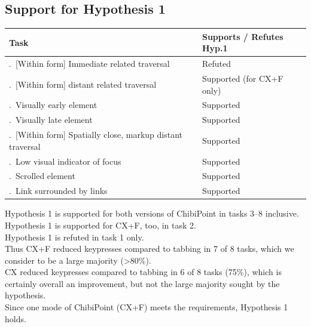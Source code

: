 \documentclass[a4paper, 12pt]{report}
\begin{document}
\subsection{Support for Hypothesis 1}
\newcommand{\tasktablenumber}{\stepcounter{tasktablecounter}\arabic{tasktablecounter}.~}
\begin{tabular}{l l}
\hline\hline %
Task & Supports / Refutes Hyp.1 \\ [0.5ex] %
\hline %
\tasktablenumber [Within form] Immediate related traversal & Refuted\\ \relax
\tasktablenumber [Within form] distant related traversal & Supported (for CX+F only)\\ \relax
\tasktablenumber Visually early element & Supported\\ \relax
\tasktablenumber Visually late element & Supported\\ \relax
\tasktablenumber [Within form] Spatially close, markup distant traversal & Supported\\ \relax
\tasktablenumber Low visual indicator of focus & Supported\\ \relax
\tasktablenumber Scrolled element & Supported\\ \relax
\tasktablenumber Link surrounded by links & Supported\\ [1ex] %
\hline %
\end{tabular}

Hypothesis 1 is supported for both versions of ChibiPoint in tasks 3--8 inclusive.\\
Hypothesis 1 is supported for CX+F, too, in task 2.\\
Hypothesis 1 is refuted in task 1 only.\\
Thus CX+F reduced keypresses compared to tabbing in 7 of 8 tasks, which we consider to be a large majority (>80\%).\\
CX reduced keypresses compared to tabbing in 6 of 8 tasks (75\%), which is certainly overall an improvement, but not the large majority sought by the hypothesis.\\
Since one mode of ChibiPoint (CX+F) meets the requirements, Hypothesis 1 holds.
\end{document}

